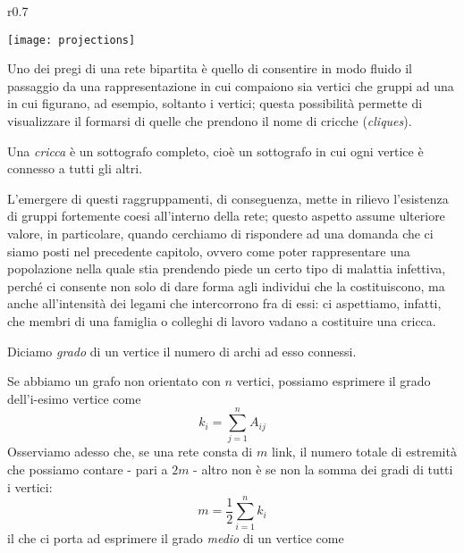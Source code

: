\begin{wrapfigure}{r}{0.7\textwidth}
	\begin{center}
		\texttt{[image: projections]}
	\end{center}
	\caption{
	\cite{Newman}}
	\label{fig:projs}
\end{wrapfigure}
	Uno dei pregi di una rete bipartita è quello di consentire in modo fluido il passaggio da una rappresentazione in cui compaiono sia vertici che gruppi ad una in cui figurano, ad esempio, soltanto i vertici; questa possibilità permette di visualizzare il formarsi di quelle che prendono il nome di cricche (\emph{cliques}).
\begin{definizione} \cite{Bickle}
Una \emph{cricca} è un sottografo completo, cioè un sottografo in cui ogni vertice è connesso a tutti gli altri.
\end{definizione}
L'emergere di questi raggruppamenti, di conseguenza, mette in rilievo l'esistenza di gruppi fortemente coesi all'interno della rete; questo aspetto assume ulteriore valore, in particolare, quando cerchiamo di rispondere ad una domanda che ci siamo posti nel precedente capitolo, ovvero come poter rappresentare una popolazione nella quale stia prendendo piede un certo tipo di malattia infettiva, perché ci consente non solo di dare forma agli individui che la costituiscono, ma anche all'intensità dei legami che intercorrono fra di essi: ci aspettiamo, infatti, che membri di una famiglia o colleghi di lavoro vadano a costituire una cricca. \\
\begin{definizione}
Diciamo \emph{grado} di un vertice il numero di archi ad esso connessi.
\end{definizione}
Se abbiamo un grafo non orientato con $ n $ vertici, possiamo esprimere il grado dell'i-esimo vertice come
\begin{equation}
	k_i = \sum_{j=1}^n A_{ij}
\end{equation}
Osserviamo adesso che, se una rete consta di $ m $ link, il numero totale di estremità che possiamo contare - pari a $ 2m $ - altro non è se non la somma dei gradi di tutti i vertici: 
\begin{equation}
	m = \frac{1}{2} \sum_{i=1}^n k_i
\end{equation}
il che ci porta ad esprimere il grado \emph{medio} di un vertice come 

